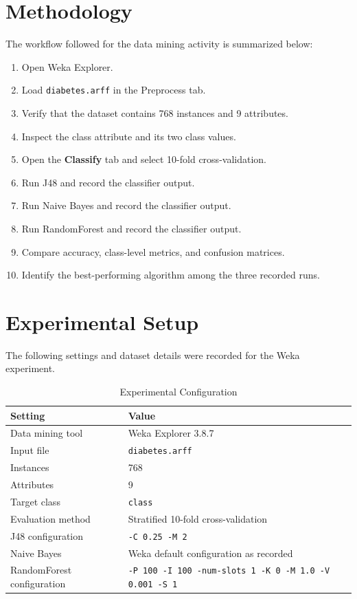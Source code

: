 \documentclass[11pt,a4paper]{article}
\begin{document}
\section{Methodology}
The workflow followed for the data mining activity is summarized below:
\begin{enumerate}
    \item Open Weka Explorer.
    \item Load \texttt{diabetes.arff} in the Preprocess tab.
    \item Verify that the dataset contains 768 instances and 9 attributes.
    \item Inspect the class attribute and its two class values.
    \item Open the \textbf{Classify} tab and select 10-fold cross-validation.
    \item Run J48 and record the classifier output.
    \item Run Naive Bayes and record the classifier output.
    \item Run RandomForest and record the classifier output.
    \item Compare accuracy, class-level metrics, and confusion matrices.
    \item Identify the best-performing algorithm among the three recorded runs.
\end{enumerate}

\section{Experimental Setup}
The following settings and dataset details were recorded for the Weka experiment.

\begin{table}[H]
\centering
\small
\caption{Experimental Configuration}
\label{tab:setup}
\begin{tabularx}{\textwidth}{lX}
\toprule
\textbf{Setting} & \textbf{Value} \\
\midrule
Data mining tool & Weka Explorer 3.8.7 \\
Input file & \texttt{diabetes.arff} \\
Instances & 768 \\
Attributes & 9 \\
Target class & \texttt{class} \\
Evaluation method & Stratified 10-fold cross-validation \\
J48 configuration & \texttt{-C 0.25 -M 2} \\
Naive Bayes & Weka default configuration as recorded \\
RandomForest configuration & \texttt{-P 100 -I 100 -num-slots 1 -K 0 -M 1.0 -V 0.001 -S 1} \\
\bottomrule
\end{tabularx}
\end{table}
\end{document}
